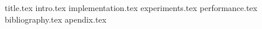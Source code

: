 \documentclass[12pt]{article}
\newcommand*{\sectiondir}{sections/}
\begin{document}
	{title.tex}
	\tableofcontents
	\newpage
	{intro.tex}
	{implementation.tex}
	{experiments.tex}
	{performance.tex}
	{bibliography.tex}
	\newpage
	{apendix.tex}
\end{document}

